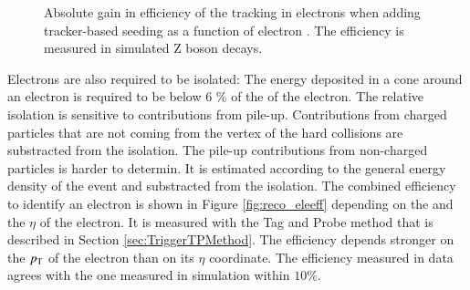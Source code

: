 \begin{figure}[htbp!]
  \begin{center}
\caption{Absolute gain in efficiency of the tracking in electrons when adding tracker-based seeding as a function of electron \pt\cite{Sirunyan:2017ulk}. 
         The efficiency is measured in simulated Z boson decays.
  \label{fig:reco_eletrackseed}}
  \end{center}
\end{figure}

Electrons are also required to be isolated: The energy deposited in a cone around an electron is required to be below 6 \% of the \pt of the electron.
The relative isolation is sensitive to contributions from pile-up. Contributions from charged particles that are not coming from the vertex of the hard collisions
are substracted from the isolation. The pile-up contributions from non-charged particles is harder to determin. It is estimated according to the general energy density
of the event and substracted from the isolation.
The combined efficiency to identify an electron is shown in Figure \ref{fig:reco_eleeff} depending on the \pt and the $\eta$ of the electron.
It is measured with the Tag and Probe method that is described in Section \ref{sec:TriggerTPMethod}.
The efficiency depends stronger on the $p_{\mathrm{T}}$ of the electron than on its $\eta$ coordinate. The efficiency measured in data agrees with the one measured in simulation within $10\%$. 

